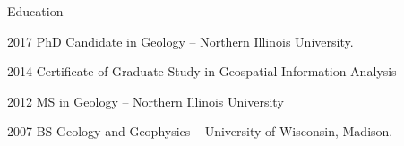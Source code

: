 \begin{cvlist}{Education}

\item[2017] PhD Candidate in Geology -- Northern Illinois University.
\item[2014] Certificate of Graduate Study in Geospatial Information Analysis
\item[2012] MS in Geology -- Northern Illinois University
\item[2007] BS Geology and Geophysics -- University of Wisconsin, Madison.

\end{cvlist}

 
